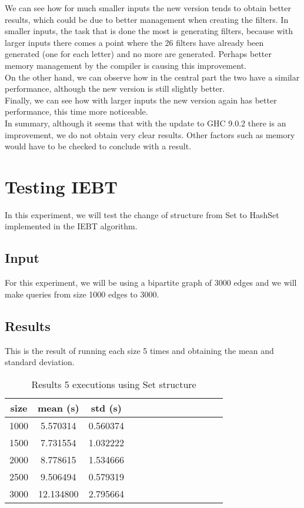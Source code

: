 We can see how for much smaller inputs the new version tends to obtain better results, which could be due to better management when creating the filters.
In smaller inputs, the task that is done the most is generating filters, because with larger inputs there comes a point where the 26 filters have already been generated (one for each letter) and no more are generated.
Perhaps better memory management by the compiler is causing this improvement. \\
On the other hand, we can observe how in the central part the two have a similar performance, although the new version is still slightly better. \\
Finally, we can see how with larger inputs the new version again has better performance, this time more noticeable. \\

In summary, although it seems that with the update to GHC 9.0.2 there is an improvement, we do not obtain very clear results.
Other factors such as memory would have to be checked to conclude with a result.

\section{Testing IEBT}
In this experiment, we will test the change of structure from Set to HashSet implemented in the IEBT algorithm.

\subsection*{Input}
For this experiment, we will be using a bipartite graph of 3000 edges and we will make queries from size 1000 edges to 3000.

\subsection*{Results}
This is the result of running each size 5 times and obtaining the mean and standard deviation.

\begin{table}[H]
    \begin{adjustwidth}{-1in}{-1in}
    \centering
    \begin{tabular}{|c|c|c|c|c|c|c|c|c|c|c|c|c|}
    \hline
    size & mean (s)& std (s) \\
    \hline
    1000 & 5.570314 & 0.560374 \\
    1500 & 7.731554 & 1.032222 \\
    2000 & 8.778615 & 1.534666 \\
    2500 & 9.506494 & 0.579319 \\
    3000 & 12.134800 & 2.795664 \\
    \hline
    \end{tabular}
    \caption[{[Exp] Table results Set structure}]{Results 5 executions using Set structure}
    \label{results4}
    \end{adjustwidth}
\end{table}

